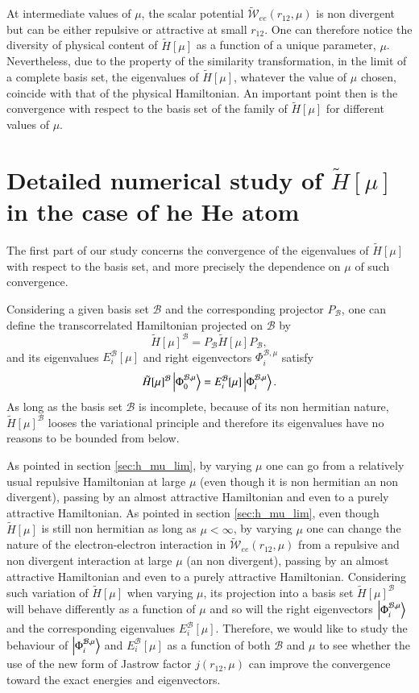 \documentclass[aip,jcp,reprint,noshowkeys,superscriptaddress]{revtex4-1}
\newcommand{\phimub}[0]{\Phi^{\mathcal{B},\mu}_0}
\newcommand{\phiimub}[0]{\Phi^{\mathcal{B},\mu}_i}
\newcommand{\basis}[0]{\mathcal{B}}
\begin{document}
At intermediate values of $\mu$, the scalar potential $\tilde{\mathcal{W}}_{ee}(r_{12},\mu) $ is non divergent but can be either repulsive or attractive at small $r_{12}$. One can therefore notice the diversity of physical content of $\tilde{H}[\mu]$ as a function of a unique parameter, $\mu$. 
Nevertheless, due to the property of the similarity transformation, in the limit of a complete basis set, the eigenvalues of $\tilde{H}[\mu]$, whatever the value of $\mu$ chosen, coincide with that of the physical Hamiltonian. An important point then is the convergence with respect to the basis set of the family of $\tilde{H}[\mu]$ for different values of $\mu$.  

\section{Detailed numerical study of $\tilde{H}[\mu]$ in the case of he He atom}
The first part of our study concerns the convergence of the eigenvalues of $\tilde{H}[\mu]$ with respect to the basis set, and more precisely the dependence on $\mu$ of such convergence. 

Considering a given basis set $\basis$ and the corresponding projector $P_\basis$, one can define the transcorrelated Hamiltonian projected on $\basis$ by
\begin{equation}
 \tilde{H}[\mu]^{\basis} = P_\basis \tilde{H}[\mu] P_\basis,
\end{equation}
and its eigenvalues $E_i^{\basis}[\mu]$ and right eigenvectors $\phiimub$ satisfy 
\begin{equation}
 \tilde{H}[\mu]^{\basis} \ket{\phimub} = E_i^{\basis}[\mu] \ket{\phiimub}. 
\end{equation}
As long as the basis set $\basis$ is incomplete, because of its non hermitian nature, $\tilde{H}[\mu]^{\basis}$ looses the variational principle and therefore its eigenvalues have no reasons to be bounded from below.  

As pointed in section \ref{sec:h_mu_lim}, by varying $\mu$ one can go from a relatively usual repulsive Hamiltonian at large $\mu$ (even though it is non hermitian an non divergent), passing by an almost attractive Hamiltonian and even to a purely attractive Hamiltonian. 
As pointed in section \ref{sec:h_mu_lim}, even though $\tilde{H}[\mu]$ is still non hermitian as long as $\mu < \infty$, by varying $\mu$ one can change the nature of the electron-electron interaction in $\tilde{\mathcal{W}}_{ee}(r_{12},\mu)$ from a repulsive and non divergent interaction at large $\mu$ (an non divergent), passing by an almost attractive Hamiltonian and even to a purely attractive Hamiltonian. 
Considering such variation of $\tilde{H}[\mu]$ when varying $\mu$,  
its projection into a basis set $\tilde{H}[\mu]^{\basis}$ will behave differently as a function of $\mu$ 
and so will the right eigenvectors $\ket{\phiimub}$ and the corresponding eigenvalues $E_i^{\basis}[\mu]$. 
Therefore, we would like to study the behaviour of $\ket{\phiimub}$ and $E_i^{\basis}[\mu]$ as a function of both $\basis$ and $\mu$ to see whether the use of the new form of Jastrow factor $j(r_{12},\mu)$ can improve the convergence toward the exact energies  and eigenvectors. 
\end{document}
